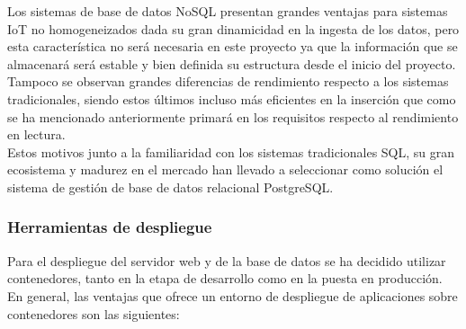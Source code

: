 \documentclass[../proyecto.tex]{subfiles}
\begin{document}
Los sistemas de base de datos NoSQL presentan grandes ventajas para sistemas IoT no homogeneizados dada su gran dinamicidad en la ingesta de los datos, pero esta característica no será necesaria en este proyecto ya que la información que se almacenará será estable y bien definida su estructura desde el inicio del proyecto. Tampoco se observan grandes diferencias de rendimiento respecto a los sistemas tradicionales, siendo estos últimos incluso más eficientes en la inserción \cite{ASIMINIDIS2018} \cite{RAUTMARE2016} que como se ha mencionado anteriormente primará en los requisitos respecto al rendimiento en lectura.\\

Estos motivos junto a la familiaridad con los sistemas tradicionales SQL, su gran ecosistema y madurez en el mercado han llevado a seleccionar como solución el sistema de gestión de base de datos relacional PostgreSQL.

\subsubsection{Herramientas de despliegue}

Para el despliegue del servidor web y de la base de datos se ha decidido utilizar contenedores, tanto en la etapa de desarrollo como en la puesta en producción. En general, las ventajas que ofrece un entorno de despliegue de aplicaciones sobre contenedores son las siguientes:\\
\end{document}
